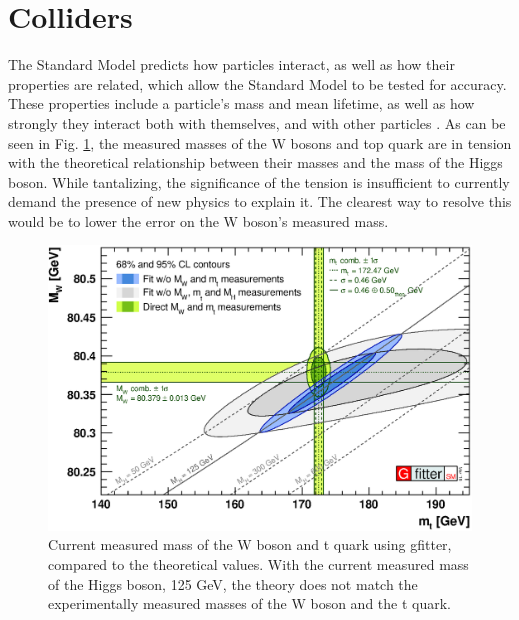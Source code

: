 \section{Colliders}
The Standard Model predicts how particles interact, as well as how their properties are related, which allow the Standard Model to be tested for accuracy. These properties include a particle's mass and mean lifetime, as well as how strongly they interact both with themselves, and with other particles \cite{LEP-2}. As can be seen in Fig. \ref{fig:gfitterResults}, the measured masses of the W bosons and top quark are in tension with the theoretical relationship between their masses and the mass of the Higgs boson. While tantalizing, the significance of the tension is insufficient to currently demand the presence of new physics to explain it. The clearest way to resolve this would be to lower the error on the W boson's measured mass. \par
\begin{figure}[!htbp]
    \centering
    \includegraphics[width=\textwidth]{figures/TheoryFigures/2018_03_20_Scan2D_MWvsmt_logo.eps}
    \caption[
        W mass gFitter results
    ]{
     Current measured mass of the W boson and t quark using gfitter, compared to the theoretical values. With the current measured mass of the Higgs boson, 125 GeV, the theory does not match the experimentally measured masses of the W boson and the t quark. 
    }
    \label{fig:gfitterResults}
\end{figure}

